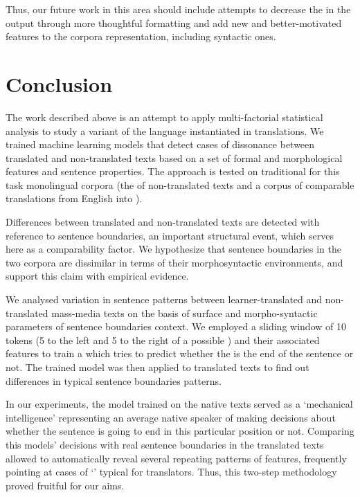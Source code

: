 \documentclass[output=paper]{langsci/langscibook.cls}
\begin{document}
Thus, our future work in this area should include attempts to decrease the  in the output through more thoughtful formatting and add new and better-motivated features to the corpora representation, including syntactic ones.  

\section{Conclusion}\label{sec:concl}

The work described above is an attempt to apply multi-factorial statistical analysis to study a variant of the  language instantiated in  translations. We trained machine learning models that detect cases of dissonance between translated and non-translated texts based on a set of formal and morphological features and sentence properties. The approach is tested on traditional for this task monolingual corpora (the  of non-translated  texts and a corpus of comparable  translations from English into ). 

Differences between translated and non-translated texts are detected with reference to sentence boundaries, an important structural event, which serves here as a comparability factor. We hypothesize that sentence boundaries in the two corpora are dissimilar in terms of their morphosyntactic environments, and support this claim with empirical evidence. 

We analysed variation in sentence patterns between learner-translated and non-translated  mass-media texts on the basis of surface and morpho-syntactic parameters of sentence boundaries context. We employed a sliding window of 10 tokens (5 to the left and 5 to the right of a possible ) and their associated features to train a  which tries to predict whether the  is the end of the sentence or not. The trained model was then applied to translated texts to find out differences in typical sentence boundaries patterns. 

In our experiments, the model trained on the native texts served as a `mechanical intelligence' representing an average native speaker of  making decisions about whether the sentence is going to end in this particular position or not. Comparing this models' decisions with real sentence boundaries in the translated texts allowed to automatically reveal several repeating patterns of features, frequently pointing at cases of `' typical for  translators. Thus, this two-step methodology proved fruitful for our aims.
\end{document}
